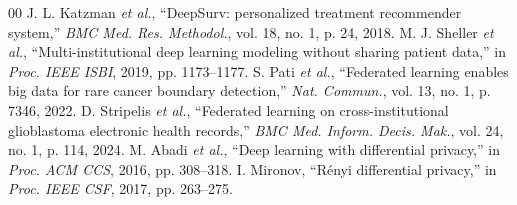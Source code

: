 \documentclass[journal,10pt,twocolumn]{IEEEtran}
\begin{document}
\begin{thebibliography}{00}
 J. L. Katzman \textit{et al.}, ``DeepSurv: personalized treatment recommender system,'' \textit{BMC Med. Res. Methodol.}, vol. 18, no. 1, p. 24, 2018.
 M. J. Sheller \textit{et al.}, ``Multi-institutional deep learning modeling without sharing patient data,'' in \textit{Proc. IEEE ISBI}, 2019, pp. 1173--1177.
 S. Pati \textit{et al.}, ``Federated learning enables big data for rare cancer boundary detection,'' \textit{Nat. Commun.}, vol. 13, no. 1, p. 7346, 2022.
 D. Stripelis \textit{et al.}, ``Federated learning on cross-institutional glioblastoma electronic health records,'' \textit{BMC Med. Inform. Decis. Mak.}, vol. 24, no. 1, p. 114, 2024.
 M. Abadi \textit{et al.}, ``Deep learning with differential privacy,'' in \textit{Proc. ACM CCS}, 2016, pp. 308--318.
 I. Mironov, ``R\'enyi differential privacy,'' in \textit{Proc. IEEE CSF}, 2017, pp. 263--275.
\end{thebibliography}
\end{document}
